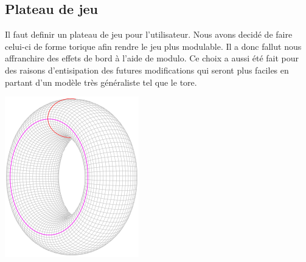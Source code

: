 \documentclass[10pt,a4paper,oneside]{report}
\begin{document}
\subsection{Plateau de jeu}
        Il faut definir un plateau de jeu pour l'utilisateur. Nous avons decidé de faire celui-ci de forme torique afin rendre le jeu plus modulable. Il a donc fallut nous affranchire des effets de bord à l'aide de modulo. Ce choix a aussi été fait pour des raisons d'entisipation des futures modifications qui seront plus faciles en partant d'un modèle très généraliste tel que le tore.
        \begin{center}
        \includegraphics[scale=0.3]{tor.png}
        \end{center}
        
\end{document}
